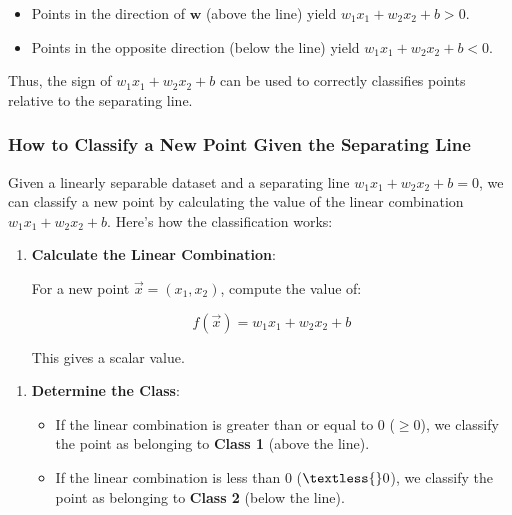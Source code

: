 \documentclass[11pt]{article}
\providecommand{\tightlist}{%
      \setlength{\itemsep}{0pt}\setlength{\parskip}{0pt}}
\begin{document}
\begin{itemize}
\tightlist
\item
  Points in the direction of $ \mathbf{w} $ (above the line) yield
  $w_1 x_1 + w_2 x_2 + b > 0$.
\item
  Points in the opposite direction (below the line) yield
  $w_1 x_1 + w_2 x_2 + b < 0$.
\end{itemize}

Thus, the sign of $w_1 x_1 + w_2 x_2 + b$ can be used to correctly
classifies points relative to the separating line.

    \subsubsection{How to Classify a New Point Given the Separating
Line}\label{how-to-classify-a-new-point-given-the-separating-line}

Given a linearly separable dataset and a separating line $ w_1 x_1 +
w_2 x_2 + b = 0 $, we can classify a new point by calculating the
value of the linear combination $ w_1 x_1 + w_2 x_2 + b $. Here's
how the classification works:

\begin{enumerate}
\def\labelenumi{\arabic{enumi}.}
\item
  \textbf{Calculate the Linear Combination}:

  For a new point $\vec{x}= (x_1, x_2) $, compute the value of:

  $$
  f(\vec{x}) = w_1 x_1 + w_2 x_2 + b
  $$

  This gives a scalar value.
\end{enumerate}

\begin{enumerate}
\def\labelenumi{\arabic{enumi}.}
\setcounter{enumi}{1}
\tightlist
\item
  \textbf{Determine the Class}:

  \begin{itemize}
  \tightlist
  \item
    If the linear combination is greater than or equal to 0 ($ \geq 0
    $), we classify the point as belonging to \textbf{Class 1} (above
    the line).
  \item
    If the linear combination is less than 0 ($ \textless{} 0 $), we
    classify the point as belonging to \textbf{Class 2} (below the
    line).
  \end{itemize}
\end{enumerate}
\end{document}

